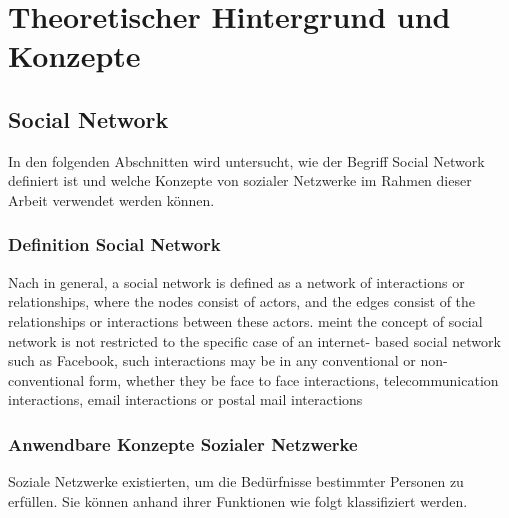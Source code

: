 
\chapter{Theoretischer Hintergrund und Konzepte}


\section{Social Network}

In den folgenden Abschnitten wird untersucht, wie der Begriff Social Network definiert ist und welche Konzepte von sozialer Netzwerke im Rahmen dieser Arbeit verwendet werden können.


\subsection{Definition Social Network}


Nach \textcite[S. 2]{aggarwal:sn} \glqq in general, a social network is defined as a network of interactions or relationships, where the nodes consist of actors, and the edges consist of the relationships or interactions between these actors.\grqq \textcite{aggarwal:sn} meint \glqq the concept of social network is not restricted to the specific case of an internet- based social network such as Facebook, such interactions may be in any conventional or non-conventional form, whether they be face to face interactions, telecommunication interactions, email interactions or postal mail interactions\grqq


\subsection{Anwendbare Konzepte Sozialer Netzwerke}

Soziale Netzwerke existierten, um die Bedürfnisse bestimmter Personen zu erfüllen. Sie können anhand ihrer Funktionen wie folgt klassifiziert werden.

